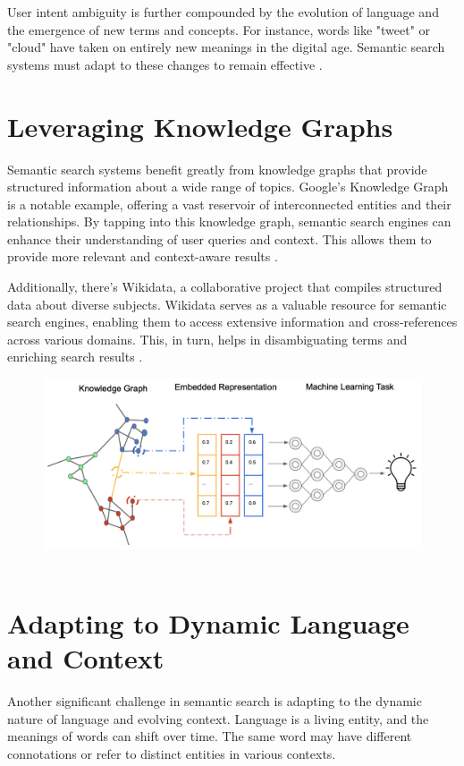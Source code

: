 \documentclass[10pt,oneside,a4paper]{article}
\begin{document}
User intent ambiguity is further compounded by the evolution of language and the emergence of new terms and concepts. For instance, words like "tweet" or "cloud" have taken on entirely new meanings in the digital age. Semantic search systems must adapt to these changes to remain effective \cite{Smith2018}.

\section{Leveraging Knowledge Graphs}
Semantic search systems benefit greatly from knowledge graphs that provide structured information about a wide range of topics. Google's Knowledge Graph is a notable example, offering a vast reservoir of interconnected entities and their relationships. By tapping into this knowledge graph, semantic search engines can enhance their understanding of user queries and context. This allows them to provide more relevant and context-aware results \cite{Singhal2012}.

Additionally, there's Wikidata, a collaborative project that compiles structured data about diverse subjects. Wikidata serves as a valuable resource for semantic search engines, enabling them to access extensive information and cross-references across various domains. This, in turn, helps in disambiguating terms and enriching search results \cite{Vrandecic2014}.


\begin{figure}[h]
\centering
\includegraphics[scale=0.4]{LKG.png}\
\end{figure}

\section{Adapting to Dynamic Language and Context}
Another significant challenge in semantic search is adapting to the dynamic nature of language and evolving context. Language is a living entity, and the meanings of words can shift over time. The same word may have different connotations or refer to distinct entities in various contexts.
\end{document}
